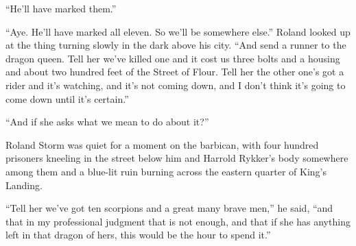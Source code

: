 “He’ll have marked them.”

“Aye. He’ll have marked all eleven. So we’ll be somewhere else.” Roland looked up at the thing turning slowly in the dark above his city. “And send a runner to the dragon queen. Tell her we’ve killed one and it cost us three bolts and a housing and about two hundred feet of the Street of Flour. Tell her the other one’s got a rider and it’s watching, and it’s not coming down, and I don’t think it’s going to come down until it’s certain.”

“And if she asks what we mean to do about it?”

Roland Storm was quiet for a moment on the barbican, with four hundred prisoners kneeling in the street below him and Harrold Rykker’s body somewhere among them and a blue-lit ruin burning across the eastern quarter of King’s Landing.

“Tell her we’ve got ten scorpions and a great many brave men,” he said, “and that in my professional judgment that is not enough, and that if she has anything left in that dragon of hers, this would be the hour to spend it.”